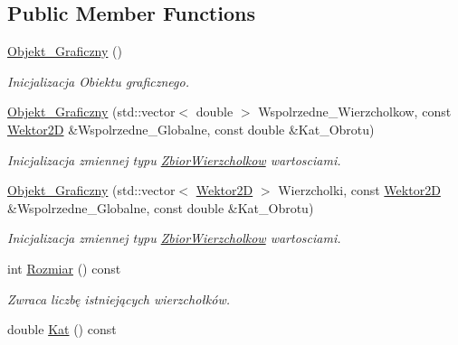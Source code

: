 \subsection*{Public Member Functions}
\begin{DoxyCompactItemize}
\item 
\hypertarget{class_objekt___graficzny_a77cf5352485959ba5b511e6241080e1c}{\hyperlink{class_objekt___graficzny_a77cf5352485959ba5b511e6241080e1c}{Objekt\+\_\+\+Graficzny} ()}\label{class_objekt___graficzny_a77cf5352485959ba5b511e6241080e1c}

\begin{DoxyCompactList}\small\item\em Inicjalizacja Obiektu graficznego. \end{DoxyCompactList}\item 
\hyperlink{class_objekt___graficzny_aafb4740ff40c5719ff2da044a0797d2b}{Objekt\+\_\+\+Graficzny} (std\+::vector$<$ double $>$ Wspolrzedne\+\_\+\+Wierzcholkow, const \hyperlink{class_wektor2_d}{Wektor2\+D} \&Wspolrzedne\+\_\+\+Globalne, const double \&Kat\+\_\+\+Obrotu)
\begin{DoxyCompactList}\small\item\em Inicjalizacja zmiennej typu \hyperlink{class_zbior_wierzcholkow}{Zbior\+Wierzcholkow} wartosciami. \end{DoxyCompactList}\item 
\hyperlink{class_objekt___graficzny_a116ad8942cd4217c5eb288e4a21dce20}{Objekt\+\_\+\+Graficzny} (std\+::vector$<$ \hyperlink{class_wektor2_d}{Wektor2\+D} $>$ Wierzcholki, const \hyperlink{class_wektor2_d}{Wektor2\+D} \&Wspolrzedne\+\_\+\+Globalne, const double \&Kat\+\_\+\+Obrotu)
\begin{DoxyCompactList}\small\item\em Inicjalizacja zmiennej typu \hyperlink{class_zbior_wierzcholkow}{Zbior\+Wierzcholkow} wartosciami. \end{DoxyCompactList}\item 
\hypertarget{class_objekt___graficzny_a23eda6cc50a9926ff066e01cf2728af8}{int \hyperlink{class_objekt___graficzny_a23eda6cc50a9926ff066e01cf2728af8}{Rozmiar} () const }\label{class_objekt___graficzny_a23eda6cc50a9926ff066e01cf2728af8}

\begin{DoxyCompactList}\small\item\em Zwraca liczbę istniejących wierzchołków. \end{DoxyCompactList}\item 
\hypertarget{class_objekt___graficzny_ac2df01dee82aa90b651f6c0f24d25796}{double \hyperlink{class_objekt___graficzny_ac2df01dee82aa90b651f6c0f24d25796}{Kat} () const }\label{class_objekt___graficzny_ac2df01dee82aa90b651f6c0f24d25796}


\end{DoxyCompactItemize}
